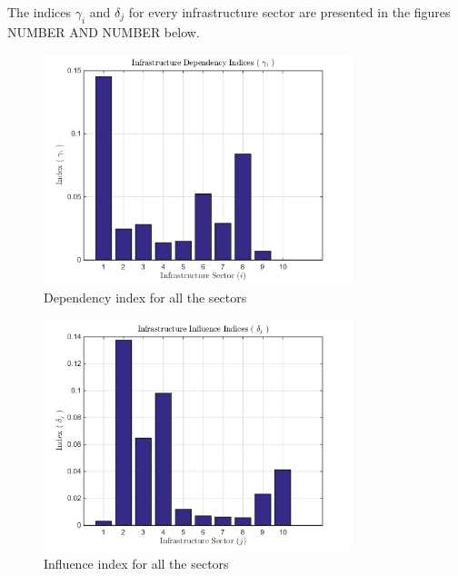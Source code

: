 \documentclass[11pt,a4paper]{article}
\begin{document}
The indices $\gamma_i$ and $\delta_j$ for every infrastructure sector are presented in the figures NUMBER AND NUMBER below.

\begin{figure}
	\centering
	\includegraphics[width=0.8\textwidth]
    {gamma.png}
    \caption{Dependency index for all the sectors}
    \label{fig: Gamma}
\end{figure}

\begin{figure}
	\centering
	\includegraphics[width=0.8\textwidth]
    {delta.png}
    \caption{Influence index for all the sectors}
    \label{fig: Delta}
\end{figure}
\end{document}
